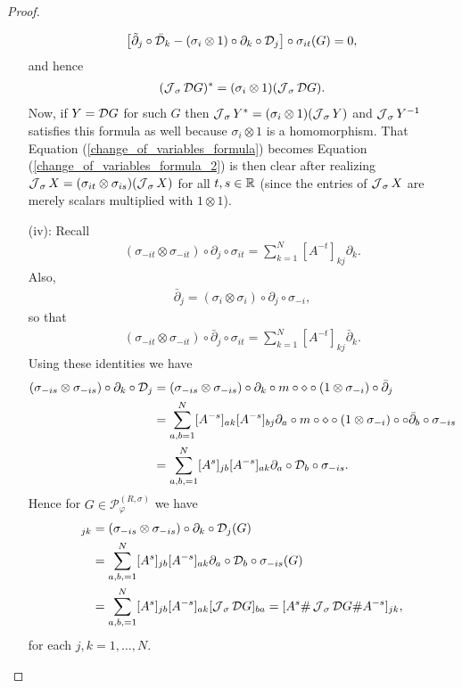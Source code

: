 \begin{proof}
\begin{enumerate}
	\begin{align*}
		\left[\tilde{\partial}_j\circ\bar{\mathcal D}_k-(\sigma_i\otimes 1)\circ\partial_k\circ\mathcal D_j\right]\circ\sigma_{it}(G)=0,
	\end{align*}
and hence
	\begin{align*}
		(\operatorname{\mathcal J}_\sigma \mathcal D G)^*=(\sigma_i\otimes 1)(\operatorname{\mathcal J}_\sigma\mathcal D G).
	\end{align*}
	Now, if $Y=\mathcal D G$ for such $G$ then $\operatorname{\mathcal J}_\sigma Y^*=(\sigma_i\otimes 1)(\operatorname{\mathcal J}_\sigma Y)$ and $\operatorname{\mathcal J}_\sigma Y^{-1}$ satisfies this formula as well because $\sigma_i\otimes 1$ is a homomorphism. That Equation (\ref{change_of_variables_formula}) becomes Equation (\ref{change_of_variables_formula_2}) is then clear after realizing $\operatorname{\mathcal J}_\sigma X=(\sigma_{it} \otimes \sigma_{is})(\operatorname{\mathcal J}_\sigma X)$  for all $t,s\in \mathbb{R}$ (since the entries of $\operatorname{\mathcal J}_\sigma X$ are merely scalars multiplied with $1\otimes 1$).
	
	\item[(iv):] Recall
		\begin{align*}
			(\sigma_{-it}\otimes\sigma_{-it})\circ\partial_j\circ\sigma_{it} = \sum_{k=1}^N [A^{-t}]_{kj} \partial_k.
		\end{align*}
	Also,
		\begin{align*}
			\bar{\partial}_j=(\sigma_i\otimes\sigma_i)\circ\partial_j\circ\sigma_{-i},
		\end{align*}
	so that
		\begin{align*}
			(\sigma_{-it}\otimes\sigma_{-it})\circ\bar{\partial}_j\circ\sigma_{it}=\sum_{k=1}^N [A^{-t}]_{kj}\bar{\partial}_k.
		\end{align*}
	Using these identities we have
		\begin{align*}
			(\sigma_{-is}\otimes\sigma_{-is})\circ \partial_k\circ \mathcal D_j &= (\sigma_{-is}\otimes\sigma_{-is})\circ\partial_k\circ m \circ\diamond\circ(1\otimes\sigma_{-i})\circ\bar{\partial}_j\\
							&=\sum_{a,b=1}^N [A^{-s}]_{ak}[A^{-s}]_{bj} \partial_a\circ m\circ\diamond\circ(1\otimes\sigma_{-i})\circ \circ\bar{\partial}_b\circ\sigma_{-is}\\
							&=\sum_{a,b,=1}^N [A^{s}]_{jb} [A^{-s}]_{ak}  \partial_a\circ\mathcal D_b\circ\sigma_{-is}.
		\end{align*}
	Hence for $G\in\mathscr{P}_\varphi^{(R,\sigma)}$ we have
		\begin{align*}
			[(\sigma_{-is}\otimes\sigma_{-is})(\J_\sigma \D G)]_{jk}&=(\sigma_{-is}\otimes\sigma_{-is})\circ \partial_k\circ \D_j(G)\\
				&=\sum_{a,b,=1}^N [A^s]_{jb} [A^{-s}]_{ak} \partial_a\circ\D_b\circ\sigma_{-is}(G)\\
				&=\sum_{a,b,=1}^N [A^s]_{jb} [A^{-s}]_{ak} [\J_\sigma\D G]_{ba} = [A^s\# \J_\sigma\D G\# A^{-s}]_{jk},
		\end{align*}
	for each $j,k=1,\ldots, N$.\qedhere
	\end{enumerate}
\end{proof}


